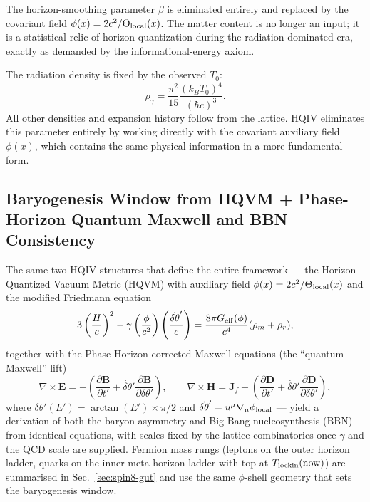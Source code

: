 \documentclass[12pt,a4paper]{article}
\begin{document}
The horizon-smoothing parameter $\beta$ is eliminated entirely and replaced by the covariant field $\phi(x) = 2c^2/\Theta_{\rm local}(x)$. The matter content is no longer an input; it is a statistical relic of horizon quantization during the radiation-dominated era, exactly as demanded by the informational-energy axiom.

The radiation density is fixed by the observed $T_0$:
\[
\rho_\gamma = \frac{\pi^2}{15} \frac{(k_B T_0)^4}{(\hbar c)^3}.
\]
All other densities and expansion history follow from the lattice.
HQIV eliminates this parameter entirely by working directly with the covariant auxiliary field $\phi(x)$, which contains the same physical information in a more fundamental form.

\subsection{Baryogenesis Window from HQVM + Phase-Horizon Quantum Maxwell and BBN Consistency}

The same two HQIV structures that define the entire framework — the Horizon-Quantized Vacuum Metric (HQVM) with auxiliary field \(\phi(x) = 2c^2/\Theta_{\rm local}(x)\) and the modified Friedmann equation
\[
3\left(\frac{H}{c}\right)^2 - \gamma \left( \frac{\phi}{c^2} \right) \left( \frac{\dot{\delta\theta}'}{c} \right) = \frac{8\pi G_{\rm eff}(\phi)}{c^4}(\rho_m + \rho_r),
\]
together with the Phase-Horizon corrected Maxwell equations (the “quantum Maxwell” lift)
\[
\nabla \times \mathbf{E} = -\left( \frac{\partial \mathbf{B}}{\partial t'} + \dot{\delta\theta}' \frac{\partial \mathbf{B}}{\partial \delta\theta'} \right), \qquad
\nabla \times \mathbf{H} = \mathbf{J}_f + \left( \frac{\partial \mathbf{D}}{\partial t'} + \dot{\delta\theta}' \frac{\partial \mathbf{D}}{\partial \delta\theta'} \right),
\]
where \(\delta\theta'(E') = \arctan(E')\times\pi/2\) and \(\dot{\delta\theta}' = u^\mu \nabla_\mu \phi_{\rm local}\) — yield a derivation of both the baryon asymmetry and Big-Bang nucleosynthesis (BBN) from identical equations, with scales fixed by the lattice combinatorics once $\gamma$ and the QCD scale are supplied.
Fermion mass rungs (leptons on the outer horizon ladder, quarks on the inner meta-horizon ladder with top at \(T_{\rm lockin}(\mathrm{now})\)) are summarised in Sec.~\ref{sec:spin8-gut} and use the same \(\phi\)-shell geometry that sets the baryogenesis window.
\end{document}
